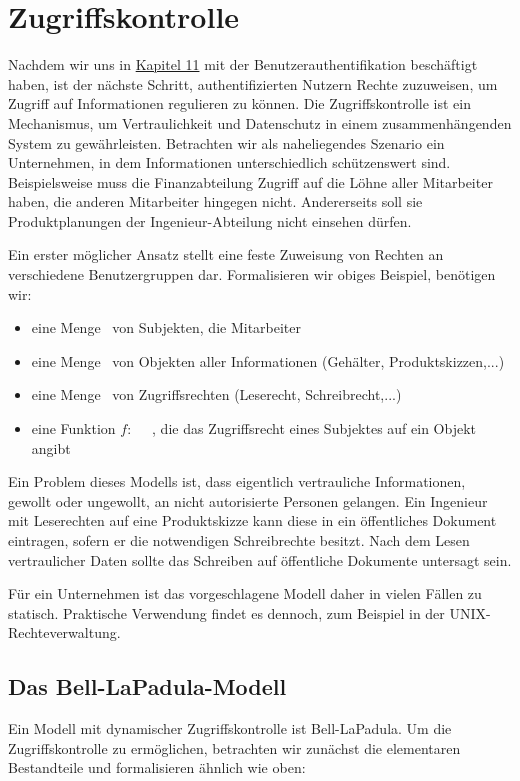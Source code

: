\chapter{Zugriffskontrolle}
Nachdem wir uns in \hyperref[cha11]{Kapitel 11} mit der Benutzerauthentifikation beschäftigt haben, ist der nächste Schritt, authentifizierten Nutzern Rechte zuzuweisen, um Zugriff auf Informationen regulieren zu können. Die Zugriffskontrolle ist ein Mechanismus, um Vertraulichkeit und Datenschutz in einem zusammenhängenden System zu gewährleisten.
Betrachten wir als naheliegendes Szenario ein Unternehmen, in dem Informationen unterschiedlich schützenswert sind. Beispielsweise muss die Finanzabteilung Zugriff auf die Löhne aller Mitarbeiter haben, die anderen Mitarbeiter hingegen nicht. Andererseits soll sie Produktplanungen der Ingenieur-Abteilung nicht einsehen dürfen.

Ein erster möglicher Ansatz stellt eine feste Zuweisung von Rechten an verschiedene Benutzergruppen dar.
Formalisieren wir obiges Beispiel, benötigen wir:

\begin{itemize}
	\item eine Menge \calS\ von Subjekten, die Mitarbeiter
	\item eine Menge \calO\ von Objekten aller Informationen (Gehälter, Produktskizzen,...)
	\item eine Menge \calR\  von Zugriffsrechten (Leserecht, Schreibrecht,...)
	\item eine Funktion \(f:\) \calS \ctsProd \calO\ \rArrow\ \calR, die das Zugriffsrecht eines Subjektes auf ein Objekt angibt
\end{itemize}

Ein Problem dieses Modells ist, dass eigentlich vertrauliche Informationen, gewollt oder ungewollt, an nicht autorisierte Personen gelangen. Ein Ingenieur mit Leserechten auf eine Produktskizze kann diese in ein öffentliches Dokument eintragen, sofern er die notwendigen Schreibrechte besitzt. Nach dem Lesen vertraulicher Daten sollte das Schreiben auf öffentliche Dokumente untersagt sein.

Für ein Unternehmen ist das vorgeschlagene Modell daher in vielen Fällen zu statisch. Praktische Verwendung findet es dennoch, zum Beispiel in der UNIX-Rechteverwaltung.

\section{Das Bell-LaPadula-Modell}
Ein Modell mit dynamischer Zugriffskontrolle ist Bell-LaPadula. Um die Zugriffskontrolle zu ermöglichen, betrachten wir zunächst die elementaren Bestandteile und formalisieren ähnlich wie oben:

